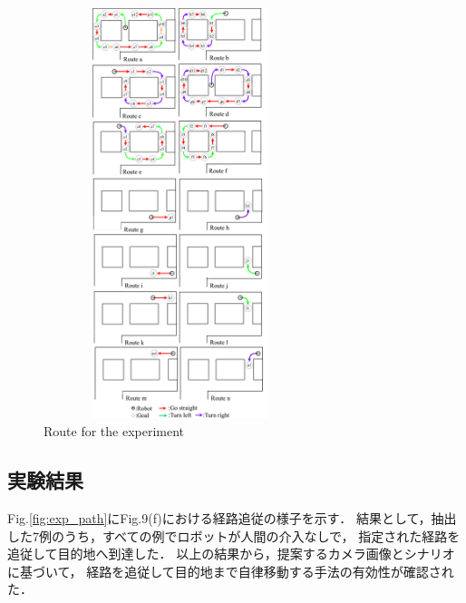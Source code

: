 \documentclass{sice-si}
\begin{document}
\begin{figure}[htbp]\vspace*{-2zh}
    \centering
     \includegraphics[height=120mm,width=80mm]{./figs/route.png}
     \caption{Route for the experiment}\label{fig:newroute}
\end{figure}

\subsection{実験結果}
Fig.\ref{fig:exp_path}にFig.9(f)における経路追従の様子を示す．
結果として，抽出した7例のうち，すべての例でロボットが人間の介入なしで，
指定された経路を追従して目的地へ到達した．
以上の結果から，提案するカメラ画像とシナリオに基づいて，
経路を追従して目的地まで自律移動する手法の有効性が確認された．
\end{document}
